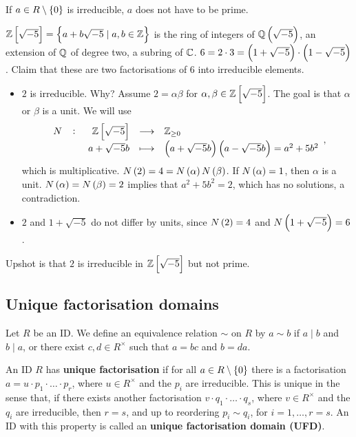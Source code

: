 \begin{remark*}
If $ a \in R \setminus \cbr{0} $ is irreducible, $ a $ does not have to be prime.
\end{remark*}

\begin{example*}
$ \Z\sbr{\sqrt{-5}} = \cbr{a + b\sqrt{-5} \mid a, b \in \Z} $ is the ring of integers of $ \Q\br{\sqrt{-5}} $, an extension of $ \mathbb{Q} $ of degree two, a subring of $ \mathbb{C} $. $ 6 = 2 \cdot 3 = \br{1 + \sqrt{-5}} \cdot \br{1 - \sqrt{-5}} $. Claim that these are two factorisations of $ 6 $ into irreducible elements.
\begin{itemize}
\item $ 2 $ is irreducible. Why? Assume $ 2 = \alpha\beta $ for $ \alpha, \beta \in \Z\sbr{\sqrt{-5}} $. The goal is that $ \alpha $ or $ \beta $ is a unit. We will use
$$ \function[N]{\Z\sbr{\sqrt{-5}}}{\Z_{\ge 0}}{a + \sqrt{-5}b}{\br{a + \sqrt{-5}b}\br{a - \sqrt{-5}b} = a^2 + 5b^2}, $$
which is multiplicative. $ N\br{2} = 4 = N\br{\alpha}N\br{\beta} $. If $ N\br{\alpha} = 1 $, then $ \alpha $ is a unit. $ N\br{\alpha} = N\br{\beta} = 2 $ implies that $ a^2 + 5b^2 = 2 $, which has no solutions, a contradiction.
\item $ 2 $ and $ 1 + \sqrt{-5} $ do not differ by units, since $ N\br{2} = 4 $ and $ N\br{1 + \sqrt{-5}} = 6 $.
\end{itemize}
Upshot is that $ 2 $ is irreducible in $ \Z\sbr{\sqrt{-5}} $ but not prime.
\end{example*}

\pagebreak

\subsection{Unique factorisation domains}

Let $ R $ be an ID. We define an equivalence relation $ \sim $ on $ R $ by $ a \sim b $ if $ a \mid b $ and $ b \mid a $, or there exist $ c, d \in R^\times $ such that $ a = bc $ and $ b = da $.

\begin{definition}
An ID $ R $ has \textbf{unique factorisation} if for all $ a \in R \setminus \cbr{0} $ there is a factorisation $ a = u \cdot p_1 \cdot \dots \cdot p_r $, where $ u \in R^\times $ and the $ p_i $ are irreducible. This is unique in the sense that, if there exists another factorisation $ v \cdot q_1 \cdot \dots \cdot q_s $, where $ v \in R^\times $ and the $ q_i $ are irreducible, then $ r = s $, and up to reordering $ p_i \sim q_i $, for $ i = 1, \dots, r = s $. An ID with this property is called an \textbf{unique factorisation domain (UFD)}.
\end{definition}

